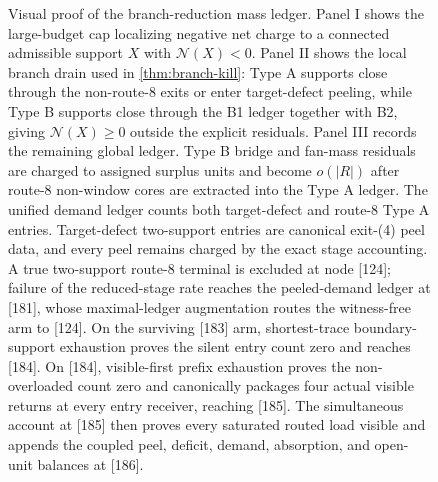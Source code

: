 \documentclass[11pt]{article}
\newcommand{\No}{\mathcal N}
\begin{document}
\begin{figure}[t]
{%
}
\caption[Visual proof of the branch-reduction mass ledger]{Visual proof of the branch-reduction mass ledger.  Panel I shows the large-budget cap localizing negative net charge to a connected admissible support \(X\) with \(\No(X)<0\).  Panel II shows the local branch drain used in \cref{thm:branch-kill}: Type A supports close through the non-route-8 exits or enter target-defect peeling, while Type B supports close through the B1 ledger together with B2, giving \(\No(X)\ge0\) outside the explicit residuals.  Panel III records the remaining global ledger.  Type B bridge and fan-mass residuals are charged to assigned surplus units and become \(o(|R|)\) after route-8 non-window cores are extracted into the Type A ledger.  The unified demand ledger counts both target-defect and route-8 Type A entries.  Target-defect two-support entries are canonical exit-\textup{(4)} peel data, and every peel remains charged by the exact stage accounting.  A true two-support route-8 terminal is excluded at node [124]; failure of the reduced-stage rate reaches the peeled-demand ledger at [181], whose maximal-ledger augmentation routes the witness-free arm to [124].  On the surviving [183] arm, shortest-trace boundary-support exhaustion proves the silent entry count zero and reaches [184].  On [184], visible-first prefix exhaustion proves the non-overloaded count zero and canonically packages four actual visible returns at every entry receiver, reaching [185].  The simultaneous account at [185] then proves every saturated routed load visible and appends the coupled peel, deficit, demand, absorption, and open-unit balances at [186].}
\label{fig:branch-closure-mass-ledger}
\end{figure}
\end{document}
